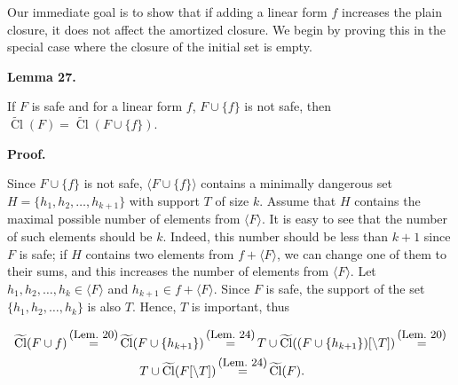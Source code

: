 \documentclass[10pt,a4paper]{article}
\begin{document}
Our immediate goal is to show that if adding a linear form $f$ increases the plain closure, it does not affect the amortized closure. We begin by proving this in the special case where the closure of the initial set is empty.\par



\par\medskip\noindent\textbf{
Lemma 27.
}\par



If $F$ is safe and for a linear form $f$, $F\cup\{f\}$ is not safe, then $\widetilde{\mathop{\mathrm{Cl}}}(F)=\widetilde{\mathop{\mathrm{Cl}}}(F\cup\{f\})$.\par



\par\medskip\noindent\textbf{Proof.}\par


Since $F\cup\{f\}$ is not safe, $\langle F\cup\{f\}\rangle$ contains a minimally dangerous set $H=\{h_{1},h_{2},\dots,h_{k+1}\}$ with support $T$ of size $k$. Assume that $H$ contains the maximal possible number of elements from $\langle F\rangle$. It is easy to see that the number of such elements should be $k$. Indeed, this number should be less than $k+1$ since $F$ is safe; if $H$ contains two elements from $f+\langle F\rangle$, we can change one of them to their sums, and this increases the number of elements from $\langle F\rangle$. Let $h_{1},h_{2},\dots,h_{k}\in\langle F\rangle$ and $h_{k+1}\in f+\langle F\rangle$.
Since $F$ is safe, the support of the set $\{h_{1},h_{2},\dots,h_{k}\}$ is also $T$. Hence, $T$ is important, thus\par





 
\[\begin{gathered}\widetilde{\mathop{\mathrm{Cl}}}(F\cup f)\mathop{=}\limits^{\mbox{\small(Lem.\leavevmode\nobreak\ 20)}}\widetilde{\mathop{\mathrm{Cl}}}(F\cup\{h_{k+1}\})\mathop{=}\limits^{\mbox{\small(Lem.\leavevmode\nobreak\ 24)}}T\cup\widetilde{\mathop{\mathrm{Cl}}}((F\cup\{h_{k+1}\})[\setminus T])\mathop{=}\limits^{\mbox{\small(Lem.\leavevmode\nobreak\ 20)}}\\
T\cup\widetilde{\mathop{\mathrm{Cl}}}(F[\setminus T])\mathop{=}\limits^{\mbox{\small(Lem.\leavevmode\nobreak\ 24)}}\widetilde{\mathop{\mathrm{Cl}}}(F).\quad\ \end{gathered}\] 
 
\end{document}
